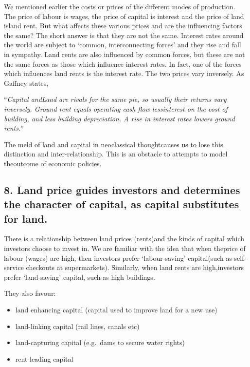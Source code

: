 \documentclass[]{tufte-handout}
\providecommand{\tightlist}{%
  \setlength{\itemsep}{0pt}\setlength{\parskip}{0pt}}
\begin{document}
We mentioned earlier the costs or prices of the different modes of
production. The price of labour is wages, the price of capital is
interest and the price of land island rent. But what affects these
various prices and are the influencing factors the same? The short
answer is that they are not the same. Interest rates around the world
are subject to `common, interconnecting forces' and they rise and fall
in sympathy. Land rents are also influenced by common forces, but these
are not the same forces as those which influence interest rates. In
fact, one of the forces which influences land rents is the interest
rate. The two prices vary inversely. As Gaffney states,

``\emph{Capital andLand are rivals for the same pie, so usually their
returns vary inversely. Ground rent equals operating cash flow
lessinterest on the cost of building, and less building depreciation. A
rise in interest rates lowers ground rents.}''

The meld of land and capital in neoclassical thoughtcauses us to lose
this distinction and inter-relationship. This is an obstacle to attempts
to model theoutcome of economic policies.

\hypertarget{land-price-guides-investors-and-determines-the-character-of-capital-as-capital-substitutes-for-land.}{%
\subsection{8. Land price guides investors and determines the character
of capital, as capital substitutes for
land.}\label{land-price-guides-investors-and-determines-the-character-of-capital-as-capital-substitutes-for-land.}}

There is a relationship between land prices (rents)and the kinds of
capital which investors choose to invest in. We are familiar with the
idea that when theprice of labour (wages) are high, then investors
prefer `labour-saving' capital(such as self-service checkouts at
supermarkets). Similarly, when land rents are high,investors prefer
`land-saving' capital, such as high buildings.

They also favour:

\begin{itemize}
\tightlist
\item
  land enhancing capital (capital used to improve land for a new use)
\item
  land-linking capital (rail lines, canals etc)
\item
  land-capturing capital (e.g.~dams to secure water rights)
\item
  rent-leading capital
\end{itemize}
\end{document}
